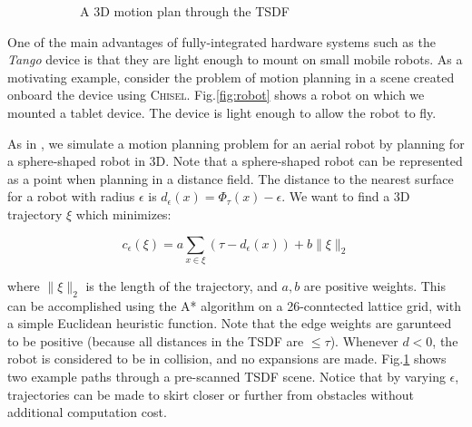 \documentclass[conference]{IEEEtran}
\newcommand{\figref}[1]{Fig.\ref{#1}}
\newcommand{\Tango}{\textit{Tango}\xspace}
\newcommand{\TSDF}{TSDF\xspace}
\newcommand{\chisel}{\textsc{Chisel}\xspace}
\begin{document}
\begin{figure}
\begin{subfigure}{0.8\columnwidth}
	 \caption{A 3D motion plan through the \TSDF}
	 \label{fig:path_plan}
	 \end{subfigure}
      \caption{}
  \label{fig:robot_figure}
\end{figure} 
 One of the main advantages of fully-integrated hardware systems such as the
\Tango device is that they are light enough to mount on small mobile
 robots. As a motivating example, consider the problem of motion planning in
 a scene created onboard the device using \chisel. \figref{fig:robot} shows a
 robot on which we mounted a tablet device. The device is light enough to allow
 the robot to fly.
 
 As in \cite{FlyingNavigation}, we simulate a motion planning problem for an
 aerial robot by planning for a sphere-shaped robot in 3D. Note that a sphere-shaped robot can be
 represented as a point when planning in a distance field. The distance to the
 nearest surface for a robot with radius $\epsilon$ is $d_{\epsilon}(x) =
 \Phi_\tau(x) - \epsilon$. We want to find a 3D trajectory $\xi$ which
 minimizes:
 
 \begin{equation}
      c_{\epsilon}(\xi) = a \sum_{x \in \xi} \left(\tau -
      d_{\epsilon}(x)\right) + b\|\xi\|_2
 \end{equation} 
 
\noindent where $\|\xi\|_2$ is the length of the trajectory, and $a, b$ are
positive weights. This can be accomplished using the A* algorithm on a
26-conntected lattice grid, with a simple Euclidean heuristic function. Note
that the edge weights are garunteed to be positive (because all distances in the
\TSDF are $\leq\tau$). Whenever $d < 0$, the robot is considered to be in
collision, and no expansions are made.
\figref{fig:path_plan} shows two example paths through a pre-scanned \TSDF scene.
Notice that by varying $\epsilon$, trajectories can be made to skirt closer or further from obstacles without
additional computation cost.
 
\end{document}
